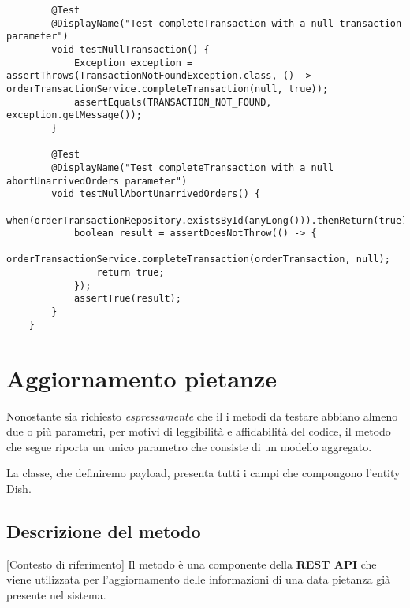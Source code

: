 \begin{verbatim}
		@Test
		@DisplayName("Test completeTransaction with a null transaction parameter")
		void testNullTransaction() {
			Exception exception = assertThrows(TransactionNotFoundException.class, () -> orderTransactionService.completeTransaction(null, true));
			assertEquals(TRANSACTION_NOT_FOUND, exception.getMessage());
		}

		@Test
		@DisplayName("Test completeTransaction with a null abortUnarrivedOrders parameter")
		void testNullAbortUnarrivedOrders() {
			when(orderTransactionRepository.existsById(anyLong())).thenReturn(true);
			boolean result = assertDoesNotThrow(() -> {
				orderTransactionService.completeTransaction(orderTransaction, null);
				return true;
			});
			assertTrue(result);
		}
	}
\end{verbatim}

\section{Aggiornamento pietanze}
\begin{info}
	Nonostante sia richiesto \textit{espressamente} che il i metodi da testare
	abbiano almeno due o più parametri, per motivi di leggibilità e affidabilità del codice, 
	il metodo che segue riporta un unico parametro che consiste di un modello aggregato.
	\par\vspace{3mm}
	La classe, che definiremo payload\footnotemark, presenta tutti i campi che compongono l'entity Dish. 
\end{info}




\subsection{Descrizione del metodo}[Contesto di riferimento]
Il metodo  è una componente della \textbf{REST API} che viene utilizzata per l'aggiornamento
delle informazioni di una data pietanza già presente nel sistema.

